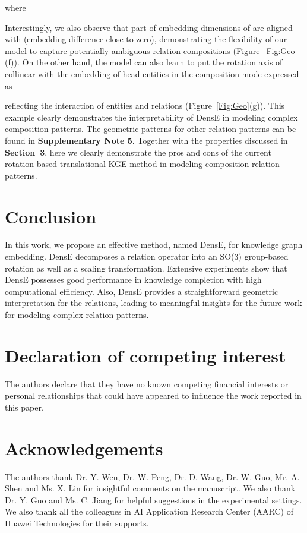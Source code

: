 \documentclass[11pt]{article}
\begin{document}
\noindent where

Interestingly, we also observe that part of embedding dimensions of  are aligned with  (embedding difference close to zero), demonstrating the flexibility of our model to capture potentially ambiguous relation compositions (Figure~\ref{Fig:Geo}(f)). On the other hand, the model can also learn to put the rotation axis of  collinear with the embedding of head entities  in the composition mode expressed as

\noindent reflecting the interaction of entities and relations (Figure~\ref{Fig:Geo}(g)). This example clearly demonstrates the interpretability of DensE in modeling complex composition patterns. The geometric patterns for other relation patterns can be found in \textbf{Supplementary Note 5}. Together with the properties discussed in \textbf{Section~3}, here we clearly demonstrate the pros and cons of the current rotation-based translational KGE method in modeling composition relation patterns.


\section{Conclusion}
In this work, we propose an effective method, named DensE, for knowledge graph embedding. DensE decomposes a relation operator into an SO(3) group-based rotation as well as a scaling transformation. Extensive experiments show that DensE possesses good performance in knowledge completion with high computational efficiency. Also, DensE provides a straightforward geometric interpretation for the relations, leading to meaningful insights for the future work for modeling complex relation patterns.

\section*{Declaration of competing interest}
The authors declare that they have no known competing financial interests or personal relationships that could have appeared to influence the work reported in this paper.

\section*{Acknowledgements}
The authors thank Dr. Y. Wen, Dr. W. Peng, Dr. D. Wang, Dr. W. Guo, Mr. A. Shen and Ms. X. Lin for insightful comments on the manuscript. We also thank Dr. Y. Guo and Ms. C. Jiang for helpful suggestions in the experimental settings. We also thank all the colleagues in AI Application Research Center (AARC) of Huawei Technologies for their supports.
\end{document}
